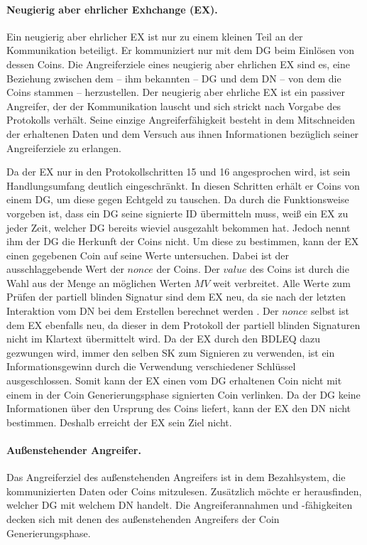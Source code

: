 \documentclass[
	fontsize=11pt,
	headings=small,
	parskip=half,           %
	bibliography=totoc,
	numbers=noenddot,       %
	open=any,               %
]{scrreprt}
\begin{document}
\paragraph{Neugierig aber ehrlicher Exhchange (EX).}
Ein neugierig aber ehrlicher EX ist nur zu einem kleinen Teil an der Kommunikation beteiligt. Er kommuniziert nur mit dem DG beim Einlösen von dessen Coins. Die Angreiferziele eines neugierig aber ehrlichen EX sind es, eine Beziehung zwischen dem -- ihm bekannten -- DG und dem DN -- von dem die Coins stammen -- herzustellen. Der neugierig aber ehrliche EX ist ein passiver Angreifer, der der Kommunikation lauscht und sich strickt nach Vorgabe des Protokolls verhält. Seine einzige Angreiferfähigkeit besteht in dem Mitschneiden der erhaltenen Daten und dem Versuch aus ihnen Informationen bezüglich seiner Angreiferziele zu erlangen.

Da der EX nur in den Protokollschritten 15 und 16 angesprochen wird, ist sein Handlungsumfang deutlich eingeschränkt. In diesen Schritten erhält er Coins von einem DG, um diese gegen Echtgeld zu tauschen. Da durch die Funktionsweise vorgeben ist, dass ein DG seine signierte ID übermitteln muss, weiß ein EX zu jeder Zeit, welcher DG bereits wieviel ausgezahlt bekommen hat. Jedoch nennt ihm der DG die Herkunft der Coins nicht. Um diese zu bestimmen, kann der EX einen gegebenen Coin auf seine Werte untersuchen. Dabei ist der ausschlaggebende Wert der $nonce$ der Coins. Der $value$ des Coins ist durch die Wahl aus der Menge an möglichen Werten $MV$ weit verbreitet. Alle Werte zum Prüfen der partiell blinden Signatur sind dem EX neu, da sie nach der letzten Interaktion vom DN bei dem Erstellen berechnet werden \cite{abe2000provably}. Der $nonce$ selbst ist dem EX ebenfalls neu, da dieser in dem Protokoll der partiell blinden Signaturen nicht im Klartext übermittelt wird. Da der EX durch den BDLEQ dazu gezwungen wird, immer den selben SK zum Signieren zu verwenden, ist ein Informationsgewinn durch die Verwendung verschiedener Schlüssel ausgeschlossen. Somit kann der EX einen vom DG erhaltenen Coin nicht mit einem in der Coin Generierungsphase signierten Coin verlinken. Da der DG keine Informationen über den Ursprung des Coins liefert, kann der EX den DN nicht bestimmen. Deshalb erreicht der EX sein Ziel nicht.

\paragraph{Außenstehender Angreifer.}
Das Angreiferziel des außenstehenden Angreifers ist in dem Bezahlsystem, die kommunizierten Daten oder Coins mitzulesen. Zusätzlich möchte er herausfinden, welcher DG mit welchem DN handelt. Die Angreiferannahmen und -fähigkeiten decken sich mit denen des außenstehenden Angreifers der Coin Generierungsphase.
\end{document}

